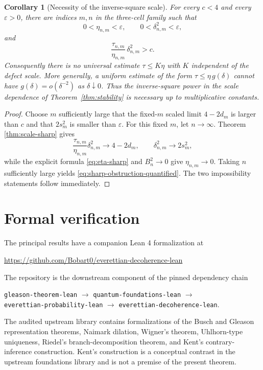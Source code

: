 \documentclass[11pt]{article}
\newtheorem{corollary}[theorem]{Corollary}
\newcommand{\dd}{\delta}
\newcommand{\etaq}{\eta}
\newcommand{\tauq}{\tau}
\begin{document}
\begin{corollary}[Necessity of the inverse-square scale]
For every $c<4$ and every $\varepsilon>0$, there are indices $m,n$ in the
three-cell family such that
\[
  0<\etaq_{n,m}<\varepsilon,\qquad
  0<\dd_{n,m}^2<\varepsilon,
\]
and
\begin{equation}\label{eq:sharp-obstruction-quantified}
  \frac{\tauq_{n,m}}{\etaq_{n,m}}\,
  \dd_{n,m}^2>c.
\end{equation}
Consequently there is no universal estimate
$\tauq\le K\etaq$ with $K$ independent of the defect scale.  More generally,
a uniform estimate of the form
$\tauq\le \etaq\,g(\dd)$ cannot have
$g(\dd)=o(\dd^{-2})$ as $\dd\downarrow0$.  Thus the inverse-square power in
the scale dependence of Theorem~\ref{thm:stability} is necessary up to
multiplicative constants.
\end{corollary}

\begin{proof}
Choose $m$ sufficiently large that the fixed-$m$ scaled limit
$4-2d_m$ is larger than $c$ and that $2s_m^2$ is smaller than
$\varepsilon$.  For this fixed $m$, let $n\to\infty$.  Theorem
\ref{thm:scale-sharp} gives
\[
  \frac{\tauq_{n,m}}{\etaq_{n,m}}\dd_{n,m}^2
  \longrightarrow 4-2d_m,
  \qquad
  \dd_{n,m}^2\longrightarrow2s_m^2,
\]
while the explicit formula \eqref{eq:eta-sharp} and
$B_n^2\to0$ give $\etaq_{n,m}\to0$.  Taking $n$ sufficiently large yields
\eqref{eq:sharp-obstruction-quantified}.  The two impossibility statements
follow immediately.
\end{proof}

\section{Formal verification}

The principal results have a companion Lean 4 formalization at
\begin{center}
\url{https://github.com/Bobart0/everettian-decoherence-lean}
\end{center}
The repository is the downstream component of the pinned dependency chain
\begin{center}
\small
\nolinkurl{gleason-theorem-lean}
$\to$
\nolinkurl{quantum-foundations-lean}
$\to$\\
\nolinkurl{everettian-probability-lean}
$\to$
\nolinkurl{everettian-decoherence-lean}.
\end{center}
The audited upstream library contains formalizations of the Busch and Gleason
representation theorems, Naimark dilation, Wigner's theorem, Uhlhorn-type
uniqueness, Riedel's branch-decomposition theorem, and Kent's
contrary-inference construction.  Kent's construction is a conceptual
contrast in the upstream foundations library and is not a premise of the
present theorem.
\end{document}
